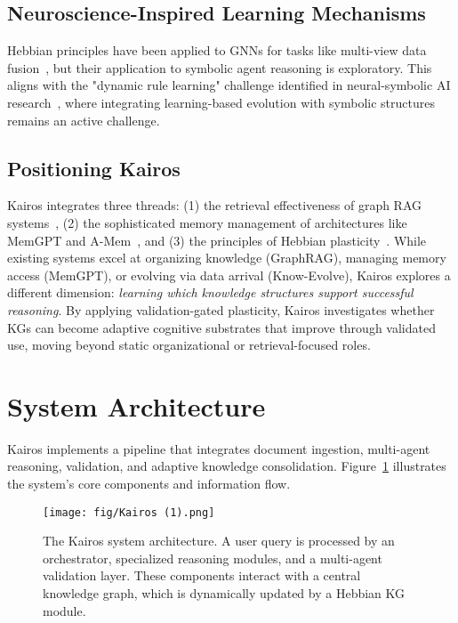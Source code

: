\documentclass{article}
\begin{document}
\subsection{Neuroscience-Inspired Learning Mechanisms}

Hebbian principles have been applied to GNNs for tasks like multi-view data fusion~\citep{mvil2024hebbian}, but their application to symbolic agent reasoning is exploratory. This aligns with the "dynamic rule learning" challenge identified in neural-symbolic AI research~\citep{yang2025neuralsymbolic}, where integrating learning-based evolution with symbolic structures remains an active challenge.

\subsection{Positioning Kairos}

Kairos integrates three threads: (1) the retrieval effectiveness of graph RAG systems~\citep{edge2024graphrag}, (2) the sophisticated memory management of architectures like MemGPT and A-Mem~\citep{packer2023memgpt,xu2025amem}, and (3) the principles of Hebbian plasticity~\citep{hebb1949organization}. While existing systems excel at organizing knowledge (GraphRAG), managing memory access (MemGPT), or evolving via data arrival (Know-Evolve), Kairos explores a different dimension: \textit{learning which knowledge structures support successful reasoning}. By applying validation-gated plasticity, Kairos investigates whether KGs can become adaptive cognitive substrates that improve through validated use, moving beyond static organizational or retrieval-focused roles.

\section{System Architecture}

Kairos implements a pipeline that integrates document ingestion, multi-agent reasoning, validation, and adaptive knowledge consolidation. Figure~\ref{fig:architecture} illustrates the system's core components and information flow.

\begin{figure}
    \centering
    \texttt{[image: fig/Kairos (1).png]}
    \caption{The Kairos system architecture. A user query is processed by an orchestrator, specialized reasoning modules, and a multi-agent validation layer. These components interact with a central knowledge graph, which is dynamically updated by a Hebbian KG module.}
    \label{fig:architecture}
\end{figure}
\end{document}
